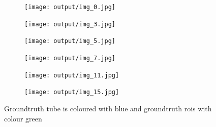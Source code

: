 \begin{figure}[h]
  \centering
  \begin{subfigure}{0.15\textwidth}
    \texttt{[image: output/img\_0.jpg]}
  \end{subfigure}
  \begin{subfigure}{0.15\textwidth}
    \texttt{[image: output/img\_3.jpg]}
  \end{subfigure}
  \begin{subfigure}{0.15\textwidth}
    \texttt{[image: output/img\_5.jpg]}
  \end{subfigure}
  \begin{subfigure}{0.15\textwidth}
    \texttt{[image: output/img\_7.jpg]}
  \end{subfigure}
  \begin{subfigure}{0.15\textwidth}
    \texttt{[image: output/img\_11.jpg]}
  \end{subfigure}
  \begin{subfigure}{0.15\textwidth}
    \texttt{[image: output/img\_15.jpg]}
  \end{subfigure}
  \caption{Groundtruth tube is coloured with blue and groundtruth rois with colour green}
  \label{fig:gt_tubes_and_rois}
\end{figure}


